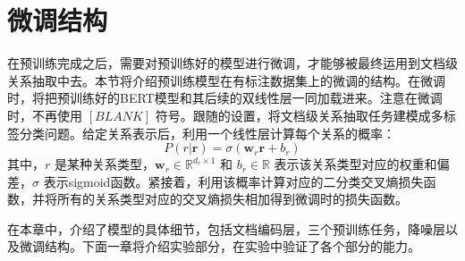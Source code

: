 \section{微调结构}
在预训练完成之后，需要对预训练好的模型进行微调，才能够被最终运用到文档级关系抽取中去。本节将介绍预训练模型在有标注数据集上的微调的结构。在微调时，将把预训练好的BERT模型和其后续的双线性层一同加载进来。注意在微调时，不再使用 $[BLANK]$ 符号。跟随\citet{yao2019docred}的设置，将文档级关系抽取任务建模成多标签分类问题。给定关系表示后，利用一个线性层计算每个关系的概率：
\begin{equation}
	P(r|\mathbf{r}) = \sigma(\mathbf{w}_r\mathbf{r} + b_r)
\end{equation}
其中，$r$ 是某种关系类型，$\mathbf{w}_r \in \mathbb{R}^{d_r \times 1}$ 和 $b_r \in \mathbb{R}$ 表示该关系类型对应的权重和偏差，$\sigma$ 表示sigmoid函数。紧接着，利用该概率计算对应的二分类交叉熵损失函数，并将所有的关系类型对应的交叉熵损失相加得到微调时的损失函数。


\hspace*{\fill}

在本章中，介绍了模型的具体细节，包括文档编码层，三个预训练任务，降噪层以及微调结构。下面一章将介绍实验部分，在实验中验证了各个部分的能力。




